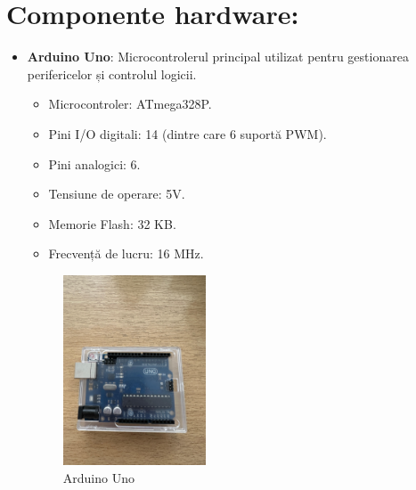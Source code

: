 \documentclass{report}
\begin{document}
\section{Componente hardware:}
\begin{itemize}
    \item \textbf{Arduino Uno}: Microcontrolerul principal utilizat pentru gestionarea perifericelor și controlul logicii.
    \begin{itemize}
        \item Microcontroler: ATmega328P.
        \item Pini I/O digitali: 14 (dintre care 6 suportă PWM).
        \item Pini analogici: 6.
        \item Tensiune de operare: 5V.
        \item Memorie Flash: 32 KB.
        \item Frecvență de lucru: 16 MHz.
    \end{itemize}
    \begin{figure}[H]
    \centering
    \includegraphics[width=0.4\textwidth]{arduino.jpg}
    \caption{Arduino Uno}
    \label{fig:earduino}
\end{figure}
    

\end{itemize}
\end{document}
